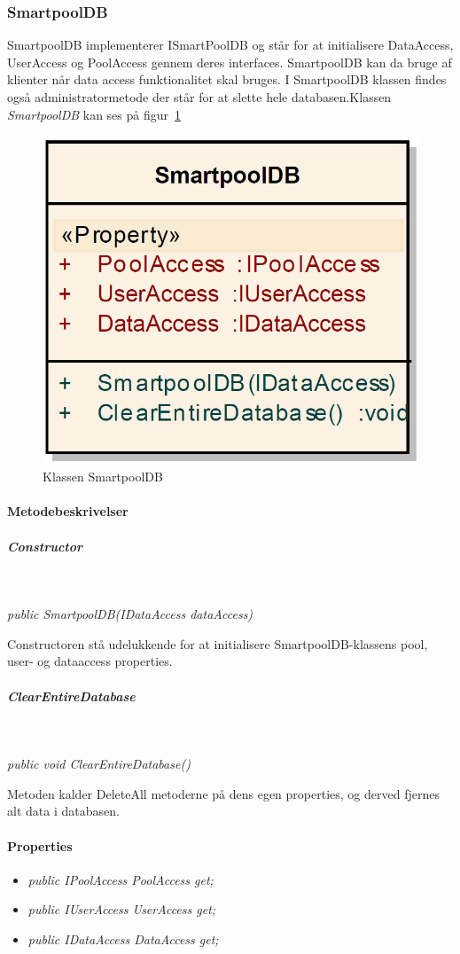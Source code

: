 \subsubsection{SmartpoolDB}
SmartpoolDB implementerer ISmartPoolDB og står for at initialisere DataAccess, UserAccess og PoolAccess gennem deres interfaces. SmartpoolDB kan da bruge af klienter når data access funktionalitet skal bruges. I SmartpoolDB klassen findes også administratormetode der står for at slette hele databasen.Klassen \textit{SmartpoolDB} kan ses på figur~\ref{fig:smartpoolDBClass}

\begin{figure}
\centering
\includegraphics[width=0.3\linewidth]{figs/implementering/smartpoolDBClass.PNG}
\caption{Klassen SmartpoolDB}
\label{fig:smartpoolDBClass}
\end{figure}

\paragraph{Metodebeskrivelser}

\subparagraph{Constructor}\

\textit{public SmartpoolDB(IDataAccess dataAccess)}

Constructoren stå udelukkende for at initialisere SmartpoolDB-klassens pool, user- og dataaccess properties.

\subparagraph{ClearEntireDatabase}\

\textit{public void ClearEntireDatabase()}

Metoden kalder DeleteAll metoderne på dens egen properties, og derved fjernes alt data i databasen.

\paragraph{Properties}

\begin{itemize}
	\item \textit{public IPoolAccess PoolAccess { get; }}
	\item \textit{public IUserAccess UserAccess { get; }}
	\item \textit{public IDataAccess DataAccess { get; }}
\end{itemize}





